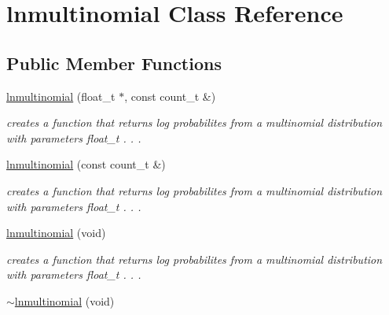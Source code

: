 \hypertarget{classlnmultinomial}{\section{lnmultinomial Class Reference}
\label{classlnmultinomial}
}
\subsection*{Public Member Functions}
\begin{DoxyCompactItemize}
\item 
\hypertarget{classlnmultinomial_a338ae23db2aed67713045e130622badc}{\hyperlink{classlnmultinomial_a338ae23db2aed67713045e130622badc}{lnmultinomial} (float\-\_\-t $\ast$, const count\-\_\-t \&)}\label{classlnmultinomial_a338ae23db2aed67713045e130622badc}

\begin{DoxyCompactList}\small\item\em creates a function that returns log probabilites from a multinomial distribution with parameters float\-\_\-t . . . \end{DoxyCompactList}\item 
\hypertarget{classlnmultinomial_a0918e1067d0d8bb764c49958dbc41ce8}{\hyperlink{classlnmultinomial_a0918e1067d0d8bb764c49958dbc41ce8}{lnmultinomial} (const count\-\_\-t \&)}\label{classlnmultinomial_a0918e1067d0d8bb764c49958dbc41ce8}

\begin{DoxyCompactList}\small\item\em creates a function that returns log probabilites from a multinomial distribution with parameters float\-\_\-t . . . \end{DoxyCompactList}\item 
\hypertarget{classlnmultinomial_a899b2fc425a88cf083f6aaea67dc3b65}{\hyperlink{classlnmultinomial_a899b2fc425a88cf083f6aaea67dc3b65}{lnmultinomial} (void)}\label{classlnmultinomial_a899b2fc425a88cf083f6aaea67dc3b65}

\begin{DoxyCompactList}\small\item\em creates a function that returns log probabilites from a multinomial distribution with parameters float\-\_\-t . . . \end{DoxyCompactList}\item 
\hypertarget{classlnmultinomial_a129235c2be242e7aaf05fcdf62575ade}{\hyperlink{classlnmultinomial_a129235c2be242e7aaf05fcdf62575ade}{$\sim$lnmultinomial} (void)}\label{classlnmultinomial_a129235c2be242e7aaf05fcdf62575ade}


\end{DoxyCompactItemize}
